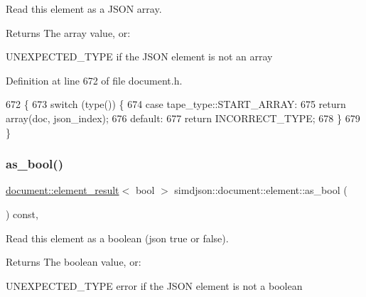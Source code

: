 Read this element as a J\+S\+ON array. 

\begin{DoxyReturn}{Returns}
The array value, or\+:
\begin{DoxyItemize}
\item U\+N\+E\+X\+P\+E\+C\+T\+E\+D\+\_\+\+T\+Y\+PE if the J\+S\+ON element is not an array 
\end{DoxyItemize}
\end{DoxyReturn}


Definition at line 672 of file document.\+h.


\begin{DoxyCode}
672                                                                                       \{
673   \textcolor{keywordflow}{switch} (type()) \{
674     \textcolor{keywordflow}{case} tape\_type::START\_ARRAY:
675       \textcolor{keywordflow}{return} array(doc, json\_index);
676     \textcolor{keywordflow}{default}:
677       \textcolor{keywordflow}{return} INCORRECT\_TYPE;
678   \}
679 \}
\end{DoxyCode}
\mbox{\label{classsimdjson_1_1document_1_1element_a6df6ba7eee788af715ffd494edfa860e}} 
\subsubsection{\texorpdfstring{as\+\_\+bool()}{as\_bool()}}
{\footnotesize\ttfamily \hyperlink{classsimdjson_1_1document_1_1element__result}{document\+::element\+\_\+result}$<$ bool $>$ simdjson\+::document\+::element\+::as\+\_\+bool (\begin{DoxyParamCaption}{ }\end{DoxyParamCaption}) const\hspace{0.3cm}{\ttfamily [inline]}, {\ttfamily [noexcept]}}



Read this element as a boolean (json {\ttfamily true} or {\ttfamily false}). 

\begin{DoxyReturn}{Returns}
The boolean value, or\+:
\begin{DoxyItemize}
\item U\+N\+E\+X\+P\+E\+C\+T\+E\+D\+\_\+\+T\+Y\+PE error if the J\+S\+ON element is not a boolean 
\end{DoxyItemize}
\end{DoxyReturn}


